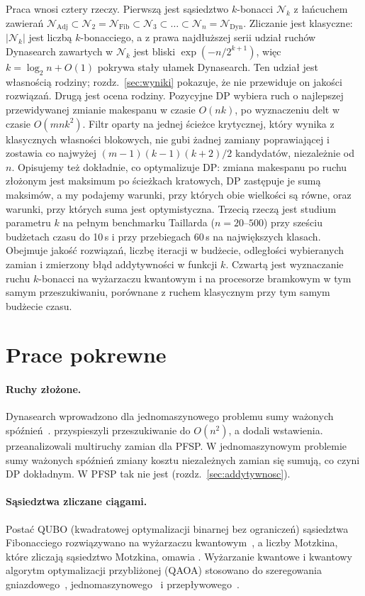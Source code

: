 \documentclass[letterpaper]{article} %
\theoremstyle{definition}
\newcommand{\N}{\mathcal{N}}
\begin{document}
Praca wnosi cztery rzeczy. Pierwszą jest sąsiedztwo $k$-bonacci $\N_k$
z łańcuchem zawierań
$\N_{\mathrm{Adj}}\subset\N_2=\N_{\mathrm{Fib}}\subset\N_3\subset
\dots\subset\N_n=\N_{\mathrm{Dyn}}$. Zliczanie jest klasyczne: $|\N_k|$ jest liczbą
$k$-bonacciego, a z prawa najdłuższej serii udział ruchów Dynasearch
zawartych w $\N_k$ jest bliski $\exp(-n/2^{k+1})$, więc
$k=\log_2 n+O(1)$ pokrywa stały ułamek Dynasearch. Ten udział jest własnością rodziny;
rozdz.~\ref{sec:wyniki} pokazuje, że nie przewiduje on jakości
rozwiązań. Drugą jest ocena rodziny. Pozycyjne DP wybiera ruch o najlepszej przewidywanej zmianie
makespanu w czasie $O(nk)$, po wyznaczeniu delt w czasie $O(mnk^2)$. Filtr oparty na
jednej ścieżce krytycznej, który wynika z klasycznych własności blokowych,
nie gubi żadnej zamiany poprawiającej i zostawia co najwyżej
$(m-1)(k-1)(k+2)/2$ kandydatów, niezależnie od $n$. Opisujemy też dokładnie, co optymalizuje DP: zmiana makespanu po
ruchu złożonym jest maksimum po ścieżkach kratowych, DP zastępuje je sumą
maksimów, a my podajemy warunki, przy których obie wielkości są równe,
oraz warunki, przy których suma jest optymistyczna. Trzecią rzeczą jest
studium parametru $k$ na pełnym benchmarku Taillarda ($n=20$--$500$) przy
sześciu budżetach czasu do 10\,s i przy przebiegach 60\,s na największych
klasach. Obejmuje jakość rozwiązań, liczbę iteracji
w budżecie, odległości wybieranych zamian i zmierzony błąd addytywności
w funkcji $k$.
Czwartą jest wyznaczanie ruchu $k$-bonacci na wyżarzaczu kwantowym i na
procesorze bramkowym w tym samym przeszukiwaniu, porównane
z ruchem klasycznym przy tym samym budżecie czasu.

\section{Prace pokrewne}
\paragraph{Ruchy złożone.} Dynasearch wprowadzono dla jednomaszynowego problemu sumy ważonych spóźnień~\cite{congram2002}.
\citet{ergun2006} przyspieszyli przeszukiwanie do $O(n^2)$,
a \citet{grosso2004} dodali wstawienia. \citet{bozejko2007} przeanalizowali multiruchy zamian dla PFSP. W jednomaszynowym problemie sumy ważonych spóźnień zmiany kosztu niezależnych zamian się sumują, co czyni DP dokładnym. W PFSP tak nie jest (rozdz.~\ref{sec:addytywnosc}).
\paragraph{Sąsiedztwa zliczane ciągami.} Postać QUBO (kwadratowej optymalizacji binarnej bez ograniczeń) sąsiedztwa Fibonacciego rozwiązywano na wyżarzaczu kwantowym~\cite{bozejko2026new}, a liczby Motzkina, które zliczają sąsiedztwo Motzkina, omawia \citet{aigner1998}. Wyżarzanie kwantowe i kwantowy algorytm optymalizacji przybliżonej (QAOA) stosowano do szeregowania gniazdowego~\cite{venturelli2015,kurowski2020,kurowski2023}, jednomaszynowego~\cite{bozejko2022distributed,bozejko2025noncrossing} i przepływowego~\cite{bozejko2026huge,bozejko2024cinti}.
\end{document}
